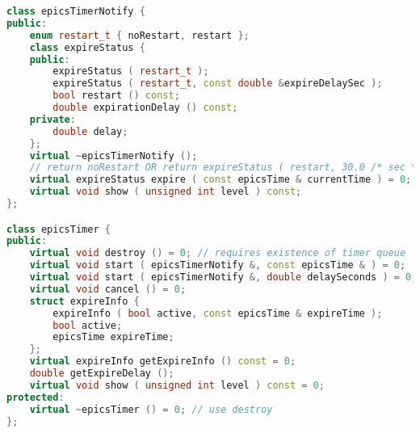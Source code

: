 \begin{lstlisting}[language=C++]
class epicsTimerNotify {
public:
    enum restart_t { noRestart, restart };
    class expireStatus {
    public:
        expireStatus ( restart_t );
        expireStatus ( restart_t, const double &expireDelaySec );
        bool restart () const;
        double expirationDelay () const;
    private:
        double delay;
    };
    virtual ~epicsTimerNotify ();
    // return noRestart OR return expireStatus ( restart, 30.0 /* sec */ );
    virtual expireStatus expire ( const epicsTime & currentTime ) = 0;
    virtual void show ( unsigned int level ) const;
};

class epicsTimer {
public:
    virtual void destroy () = 0; // requires existence of timer queue
    virtual void start ( epicsTimerNotify &, const epicsTime & ) = 0;
    virtual void start ( epicsTimerNotify &, double delaySeconds ) = 0;
    virtual void cancel () = 0;
    struct expireInfo {
        expireInfo ( bool active, const epicsTime & expireTime );
        bool active;
        epicsTime expireTime;
    };
    virtual expireInfo getExpireInfo () const = 0;
    double getExpireDelay ();
    virtual void show ( unsigned int level ) const = 0;
protected:
    virtual ~epicsTimer () = 0; // use destroy
};
\end{lstlisting}
